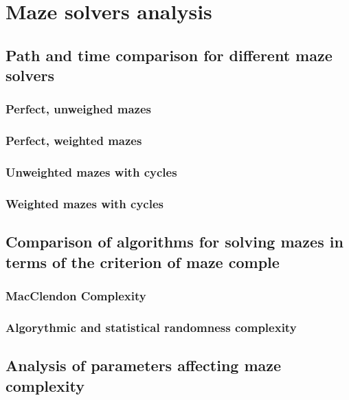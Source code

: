 \chapter{Maze solvers analysis}\label{cha:background}
\section{Path and time comparison for different maze solvers}
\subsection{Perfect, unweighed mazes}
\subsection{Perfect, weighted mazes}
\subsection{Unweighted mazes with cycles}
\subsection{Weighted mazes with cycles }
\section{Comparison of algorithms for solving mazes in terms of the criterion of maze comple}
\subsection{MacClendon Complexity}
\subsection{Algorythmic and statistical randomness complexity}
\section{Analysis of parameters affecting maze complexity}
